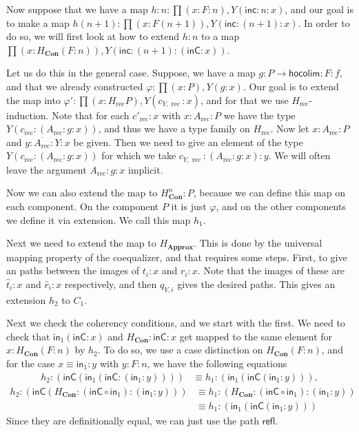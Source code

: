 \documentclass[a4paper,UKenglish]{lipics-v2016}
\newcommand{\Boperator}[1]{\mathsf{#1}}
\newcommand{\inn}{\Boperator{in}}
\newcommand{\rec}[0]{\operatorname{rec}}
\newcommand{\Con}[0]{\textbf{Con}}
\newcommand{\Approx}[0]{\textbf{Approx}}
\newcommand{\refl}[0]{\Boperator{refl}}
\newcommand{\inC}[0]{\Boperator{inC}}
\newcommand{\hocolim}[0]{\Boperator{hocolim}}
\newcommand{\inc}[0]{\Boperator{inc}}
\newcommand{\dak}[1]{\widehat{#1}}
\newcommand{\hatt}{\dak{t}}
\newcommand{\hatr}{\dak{r}}
\begin{document}
Now suppose that we have a map $h : n : \prod (x : F : n), Y(\inc : n : x)$, and our goal is to make a map $h(n+1) : \prod  (x : F(n+1)), Y(\inc : (n+1) : x)$.
In order to do so, we will first look at how to extend $h : n$ to a map $\prod (x : H_{\Con} (F : n)), Y(\inc : (n+1) : (\inC : x))$.

Let us do this in the general case.
Suppose, we have a map $g : P \rightarrow \hocolim : F : f$, and that we already constructed $\varphi : \prod (x : P), Y(g : x)$.
Our goal is to extend the map into $\varphi' : \prod (x : H_{\rec} P), Y(c_{Y, \rec} : x)$, and for that we use $H_{\rec}$-induction.
Note that for each $c'_{\rec} : x$ with $x : A_{\rec} : P$ we have the type $Y(c_{\rec} : (A_{\rec} : g : x))$, and thus we have a type family on $H_{\rec}$.
Now let $x : A_{\rec} : P$ and $y : \overline{A_{\rec}} : Y : x$ be given.
Then we need to give an element of the type $Y(c_{\rec} : (A_{\rec} : g : x))$ for which we take $c_{Y,\rec} : (A_{\rec} : g : x) : y$.
We will often leave the argument $A_{\rec} : g : x$ implicit.

Now we can also extend the map to $H_{\Con}^n : P$, because we can define this map on each component.
On the component $P$ it is just $\varphi$, and on the other components we define it via extension.
We call this map $h_1$.

Next we need to extend the map to $H_{\Approx}$.
This is done by the universal mapping property of the coequalizer, and that requires some steps.
First, to give an paths between the images of $t_i : x$ and $r_i : x$.
Note that the images of these are $\hatt_i : x$ and $\hatr_i : x$ respectively, and then $q_{Y, i}$ gives the desired paths.
This gives an extension $h_2$ to $C_1$.

Next we check the coherency conditions, and we start with the first.
We need to check that $\inn_1(\inC : x)$ and $H_{\Con} : \inC : x$ get mapped to the same element for $x : H_{\Con}(F : n)$ by $h_2$.
To do so, we use a case distinction on $H_{\Con}(F : n)$, and for the case $x \equiv \inn_1 : y$ with $y : F : n$, we have the following equations 
\begin{equation*}
\begin{split}
h_2 : (\inC(\inn_1(\inC : (\inn_1 : y))))
&\equiv 
h_1 : (\inn_1(\inC(\inn_1 : y))),
\end{split}
\end{equation*}
\begin{equation*}
\begin{split}
h_2 : (\inC(H_{\Con} : (\inC \circ \inn_1) : (\inn_1 : y)))
&\equiv
h_1 : (H_{\Con} : (\inC \circ \inn_1) : (\inn_1 : y))\\
&\equiv 
h_1 : (\inn_1(\inC(\inn_1 : y)))
\end{split}
\end{equation*}
Since they are definitionally equal, we can just use the path $\refl$.
\end{document}
